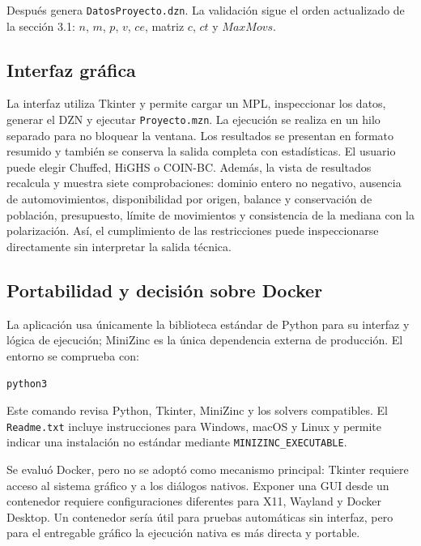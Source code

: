 \documentclass[11pt,letterpaper]{article}
\begin{document}
Después genera \texttt{DatosProyecto.dzn}. La validación sigue el orden
actualizado de la sección 3.1: \(n\), \(m\), \(p\), \(v\), \(ce\), matriz
\(c\), \(ct\) y \(MaxMovs\).

\subsection{Interfaz gráfica}

La interfaz utiliza Tkinter y permite cargar un MPL, inspeccionar los datos,
generar el DZN y ejecutar \texttt{Proyecto.mzn}. La ejecución se realiza en
un hilo separado para no bloquear la ventana. Los resultados se presentan
en formato resumido y también se conserva la salida completa con
estadísticas. El usuario puede elegir Chuffed, HiGHS o COIN-BC.
Además, la vista de resultados recalcula y muestra siete comprobaciones:
dominio entero no negativo, ausencia de automovimientos, disponibilidad por
origen, balance y conservación de población, presupuesto, límite de
movimientos y consistencia de la mediana con la polarización. Así, el
cumplimiento de las restricciones
puede inspeccionarse directamente sin interpretar la salida técnica.

\subsection{Portabilidad y decisión sobre Docker}

La aplicación usa únicamente la biblioteca estándar de Python para su
interfaz y lógica de ejecución; MiniZinc es la única dependencia externa de
producción. El entorno se comprueba con:

\begin{center}
\texttt{python3 }
\end{center}

Este comando revisa Python, Tkinter, MiniZinc y los solvers compatibles. El
\texttt{Readme.txt} incluye instrucciones para Windows, macOS y Linux y
permite indicar una instalación no estándar mediante
\texttt{MINIZINC\_EXECUTABLE}.

Se evaluó Docker, pero no se adoptó como mecanismo principal: Tkinter requiere
acceso al sistema gráfico y a los diálogos nativos. Exponer una GUI desde un
contenedor requiere configuraciones diferentes para X11, Wayland y Docker
Desktop. Un contenedor sería útil para pruebas automáticas sin interfaz, pero
para el entregable gráfico la ejecución nativa es más directa y portable.
\end{document}
